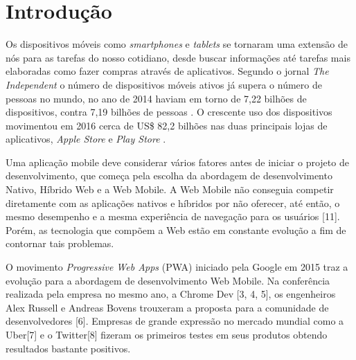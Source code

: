 \section{\esp Introdução}

Os dispositivos móveis como \textit{smartphones} e \textit{tablets} se tornaram uma extensão de nós para as tarefas do nosso cotidiano, desde buscar informações até tarefas mais elaboradas como fazer compras através de aplicativos. Segundo o jornal \textit{The Independent} o número de dispositivos móveis ativos já supera o número de pessoas no mundo, no ano de 2014 haviam em torno de 7,22 bilhões de dispositivos, contra 7,19 bilhões de pessoas \cite{2-independent}. O crescente uso dos dispositivos movimentou em 2016 cerca de US\$ 82,2 bilhões nas duas principais lojas de aplicativos, \textit{Apple Store} e \textit{Play Store} \cite{1-appannie}.

Uma aplicação mobile deve considerar vários fatores antes de iniciar o projeto de desenvolvimento, que começa pela escolha da abordagem de desenvolvimento Nativo, Híbrido Web e a Web Mobile. A Web Mobile não conseguia competir diretamente com as aplicações nativos e híbridos por não oferecer, até então, o mesmo desempenho e a mesma experiência de navegação para os usuários [11]. Porém, as tecnologia que compõem a Web estão em constante evolução a fim de contornar tais problemas.

O movimento \textit{Progressive Web Apps} (PWA) iniciado pela Google em 2015 traz a evolução para a abordagem de desenvolvimento Web Mobile. Na conferência realizada pela empresa no mesmo ano, a Chrome Dev [3, 4, 5], os engenheiros Alex Russell e Andreas Bovens trouxeram a proposta para a comunidade de desenvolvedores [6]. Empresas de grande expressão no mercado mundial como a Uber[7] e o Twitter[8] fizeram os primeiros testes em seus produtos obtendo resultados bastante positivos.

